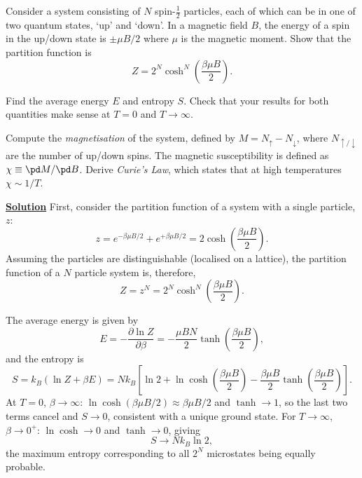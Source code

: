 Consider a system consisting of $N$ spin-$\frac{1}{2}$ particles,
each of which can be in one of two quantum states, `up' and `down'. In a
magnetic field $B$, the energy of a spin in the up/down state is $\pm\mu B/2$
where $\mu$ is the magnetic moment. Show that the partition function is
\begin{equation}
  Z = 2^N \cosh^N\!\left(\frac{\beta\mu B}{2}\right).
\end{equation}

Find the average energy $E$ and entropy $S$. Check that your results for both
quantities make sense at $T=0$ and $T\to\infty$.

Compute the \textit{magnetisation} of the system, defined by $M = N_\uparrow -
N_\downarrow$, where $N_{\uparrow/\downarrow}$ are the number of up/down spins.
The magnetic susceptibility is defined as $\chi \equiv \pd M/\pd B$. Derive
\textit{Curie's Law}, which states that at high temperatures $\chi \sim 1/T$.

\noindent \underline{\textbf{Solution}} First, consider the partition function of a system with a single particle, $z$:
\begin{equation}
    z = e^{-\beta\mu B/2} + e^{+\beta\mu B/2} = 2\cosh\left(\frac{\beta\mu B}{2}\right).
\end{equation}
Assuming the particles are distinguishable (localised on a lattice), the partition function of a $N$ particle system is, therefore,
\begin{equation}
    Z = z^N = 2^N\cosh^N\left(\frac{\beta\mu B}{2}\right).
\end{equation}

The average energy is given by
\begin{equation}
    E  = - \frac{\partial\ln Z}{\partial\beta} = -\frac{\mu BN}{2}\tanh\left(\frac{\beta\mu B}{2}\right),
\end{equation}
and the entropy is
\begin{equation}
    S = k_B(\ln Z + \beta E)
    = Nk_B\left[\ln 2 + \ln\cosh\!\left(\frac{\beta\mu B}{2}\right)
    - \frac{\beta\mu B}{2}\tanh\!\left(\frac{\beta\mu B}{2}\right)\right].
\end{equation}
At $T=0$, $\beta\to\infty$: $\ln\cosh(\beta\mu B/2)\approx \beta\mu B/2$ and $\tanh\to 1$, so the last two terms cancel and $S\to 0$, consistent with a unique ground state.
For $T\to\infty$, $\beta\to 0^+$: $\ln\cosh\to 0$ and $\tanh\to 0$, giving
\begin{equation}
    S \to Nk_B\ln 2,
\end{equation}
the maximum entropy corresponding to all $2^N$ microstates being equally probable.


